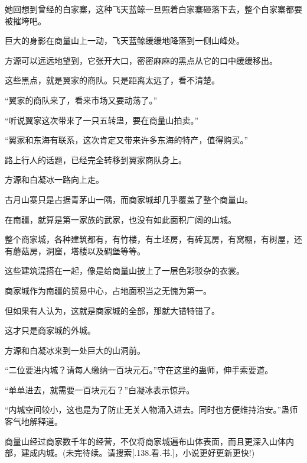 \begin{this_body}
她回想到曾经的白家寨，这种飞天蓝鲸一旦照着白家寨砸落下去，整个白家寨都要被摧垮吧。

巨大的身影在商量山上一动，飞天蓝鲸缓缓地降落到一侧山峰处。

方源可以远远地望到，它张开大口，密密麻麻的黑点从它的口中缓缓移出。

这些黑点，就是翼家的商队。只是距离太远了，看不清楚。

“翼家的商队来了，看来市场又要动荡了。”

“听说翼家这次带来了一只五转蛊，要在商量山拍卖。”

“翼家和东海有联系，这次肯定又带来许多东海的特产，值得购买。”

路上行人的话题，已经完全转移到翼家商队身上。

方源和白凝冰一路向上走。

古月山寨只是占据青茅山一隅，而商家城却几乎覆盖了整个商量山。

在南疆，就算是第一家族的武家，也没有如此面积广阔的山城。

整个商家城，各种建筑都有，有竹楼，有土坯房，有砖瓦房，有窝棚，有树屋，还有蘑菇房，洞窟，塔楼以及碉堡等等。

这些建筑混搭在一起，像是给商量山披上了一层色彩驳杂的衣裳。

商家城作为南疆的贸易中心，占地面积当之无愧为第一。

但如果有人认为，这就是商家城的全部，那就大错特错了。

这才只是商家城的外城。

方源和白凝冰来到一处巨大的山洞前。

“二位要进内城？请每人缴纳一百块元石。”守在这里的蛊师，伸手索要道。

“单单进去，就需要一百块元石？”白凝冰表示惊异。

“内城空间较小，这也是为了防止无关人物涌入进去。同时也方便维持治安。”蛊师客气地解释道。

商量山经过商家数千年的经营，不仅将商家城遍布山体表面，而且更深入山体内部，建成内城。(未完待续。请搜索[.138.看.书.]，小说更好更新更快!)

\end{this_body}

